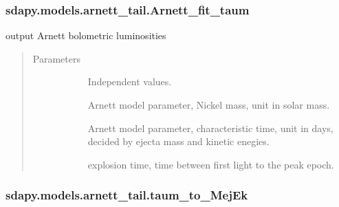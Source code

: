 \documentclass[letterpaper,10pt,english]{sphinxmanual}
\begin{document}
\subsubsection{sdapy.models.arnett\_tail.Arnett\_fit\_taum}
\label{\detokenize{generated/sdapy.models.arnett_tail.Arnett_fit_taum:sdapy-models-arnett-tail-arnett-fit-taum}}\label{\detokenize{generated/sdapy.models.arnett_tail.Arnett_fit_taum::doc}}

\begin{fulllineitems}
\label{\detokenize{generated/sdapy.models.arnett_tail.Arnett_fit_taum:sdapy.models.arnett_tail.Arnett_fit_taum}}
output Arnett bolometric luminosities
\begin{quote}\begin{description}
\item[{Parameters}] \leavevmode\begin{description}
\item[{}] \leavevmode{[}\sphinxtitleref{array}{]}
Independent values.

\item[{}] \leavevmode{[}\sphinxtitleref{float}{]}
Arnett model parameter, Nickel mass, unit in solar mass.

\item[{}] \leavevmode{[}\sphinxtitleref{float}{]}
Arnett model parameter, characteristic time, unit in days, decided by ejecta mass and kinetic enegies.

\item[{}] \leavevmode{[}\sphinxtitleref{float}{]}
explosion time, time between first light to the peak epoch.

\end{description}

\end{description}\end{quote}

\end{fulllineitems}



\subsubsection{sdapy.models.arnett\_tail.taum\_to\_MejEk}
\label{\detokenize{generated/sdapy.models.arnett_tail.taum_to_MejEk:sdapy-models-arnett-tail-taum-to-mejek}}\label{\detokenize{generated/sdapy.models.arnett_tail.taum_to_MejEk::doc}}
\end{document}
